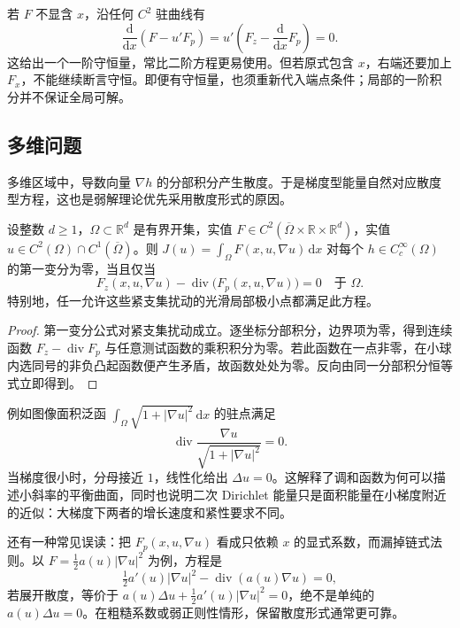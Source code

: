 若 \(F\) 不显含 \(x\)，沿任何 \(C^2\) 驻曲线有
\[
 \frac{\mathrm d}{\mathrm dx}(F-u'F_p)
 =u'\left(F_z-\frac{\mathrm d}{\mathrm dx}F_p\right)=0.
\]
这给出一个一阶守恒量，常比二阶方程更易使用。但若原式包含 \(x\)，右端还要加上 \(F_x\)，不能继续断言守恒。即便有守恒量，也须重新代入端点条件；局部的一阶积分并不保证全局可解。

\subsection{多维问题}
\label{b2:subsec:140202}

多维区域中，导数向量 \(\nabla h\) 的分部积分产生散度。于是梯度型能量自然对应散度型方程，这也是弱解理论优先采用散度形式的原因。

\begin{theorem}
\label{b2:thm:14-euler-lagrange-many}
设整数 \(d\geq1\)，\(\Omega\subset\mathbb R^d\) 是有界开集，实值 \(F\in C^2(\overline\Omega\times\mathbb R\times\mathbb R^d)\)，实值 \(u\in C^2(\Omega)\cap C^1(\overline\Omega)\)。则 \(J(u)=\int_\Omega F(x,u,\nabla u)\,\mathrm dx\) 对每个 \(h\in C_c^\infty(\Omega)\) 的第一变分为零，当且仅当
\[F_z(x,u,\nabla u)-\operatorname{div}\bigl(F_p(x,u,\nabla u)\bigr)=0\quad\text{于 }\Omega.\]
特别地，任一允许这些紧支集扰动的光滑局部极小点都满足此方程。
\end{theorem}
\begin{proof}
第一变分公式对紧支集扰动成立。逐坐标分部积分，边界项为零，得到连续函数 \(F_z-\operatorname{div}F_p\) 与任意测试函数的乘积积分为零。若此函数在一点非零，在小球内选同号的非负凸起函数便产生矛盾，故函数处处为零。反向由同一分部积分恒等式立即得到。
\end{proof}

例如图像面积泛函 \(\int_\Omega\sqrt{1+|\nabla u|^2}\,\mathrm dx\) 的驻点满足
\[\operatorname{div}\frac{\nabla u}{\sqrt{1+|\nabla u|^2}}=0.\]
当梯度很小时，分母接近 \(1\)，线性化给出 \(\Delta u=0\)。这解释了调和函数为何可以描述小斜率的平衡曲面，同时也说明二次 Dirichlet 能量只是面积能量在小梯度附近的近似：大梯度下两者的增长速度和紧性要求不同。

\ProseParagraphBreak

还有一种常见误读：把 \(F_p(x,u,\nabla u)\) 看成只依赖 \(x\) 的显式系数，而漏掉链式法则。以 \(F=\tfrac12a(u)|\nabla u|^2\) 为例，方程是
\[\tfrac12a'(u)|\nabla u|^2-\operatorname{div}(a(u)\nabla u)=0,\]
若展开散度，等价于 \(a(u)\Delta u+\tfrac12a'(u)|\nabla u|^2=0\)，绝不是单纯的 \(a(u)\Delta u=0\)。在粗糙系数或弱正则性情形，保留散度形式通常更可靠。

